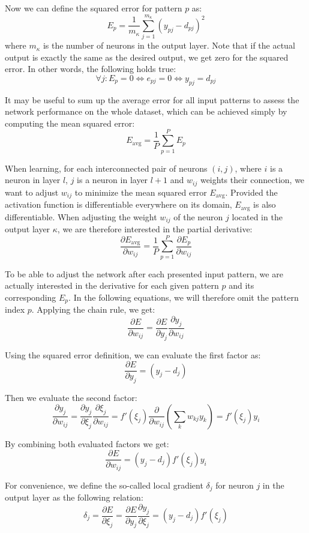 \documentclass[a4paper]{report}
\begin{document}
{Now we can define the squared error for pattern \(p\) as:
\[ E_p = \frac{1}{m_{\kappa}} \sum_{j=1}^{m_{\kappa}} \left( y_{pj} - d_{pj} \right)^2 \]
where \(m_{\kappa}\) is the number of neurons in the output layer. Note that if the actual output is exactly the same as the desired output, we get zero for the squared error. In other words, the following holds true:
\[ \forall j : E_p = 0 \Leftrightarrow e_{pj} = 0 \Leftrightarrow y_{pj} = d_{pj} \]

It may be useful to sum up the average error for all input patterns to assess the network performance on the whole dataset, which can be achieved simply by computing the mean squared error:
\[ E_{\text{avg}} = \frac{1}{P} \sum_{p=1}^{P} E_p \]

When learning, for each interconnected pair of neurons \((i, j)\), where \(i\) is a neuron in layer \(l\), \(j\) is a neuron in layer \(l + 1\) and \(w_{ij}\) weights their connection, we want to adjust \(w_{ij}\) to minimize the mean squared error \(E_{\text{avg}}\). Provided the activation function is differentiable everywhere on its domain, \(E_{\text{avg}}\) is also differentiable. When adjusting the weight \(w_{ij}\) of the neuron \(j\) located in the output layer \(\kappa\), we are therefore interested in the partial derivative:
\[ \frac{\partial E_{\text{avg}}}{\partial w_{ij}} = \frac{1}{P} \sum_{p=1}^{P} \frac{\partial E_p}{\partial w_{ij}} \]

To be able to adjust the network after each presented input pattern, we are actually interested in the derivative for each given pattern \(p\) and its corresponding \(E_p\). In the following equations, we will therefore omit the pattern index \(p\). Applying the chain rule, we get:
\[ \frac{\partial E}{\partial w_{ij}} = \frac{\partial E}{\partial y_j} \frac{\partial y_j}{\partial w_{ij}} \]

Using the squared error definition, we can evaluate the first factor as:
\[ \frac{\partial E}{\partial y_j} = (y_j - d_j) \]

Then we evaluate the second factor:
\[ \frac{\partial y_j}{\partial w_{ij}} = \frac{\partial y_j}{\partial \xi_j} \frac{\partial \xi_j}{\partial w_{ij}} = f'(\xi_j) \frac{\partial}{\partial w_{ij}} \left( \sum_{k} w_{kj} y_k \right) = f'(\xi_j) y_i \]

By combining both evaluated factors we get:
\[ \frac{\partial E}{\partial w_{ij}} = (y_j - d_j) f'(\xi_j) y_i \]

For convenience, we define the so-called local gradient \(\delta_j\) for neuron \(j\) in the output layer as the following relation:
\[ \delta_j = \frac{\partial E}{\partial \xi_j} = \frac{\partial E}{\partial y_j} \frac{\partial y_j}{\partial \xi_j} = (y_j - d_j) f'(\xi_j) \]

}
\end{document}
